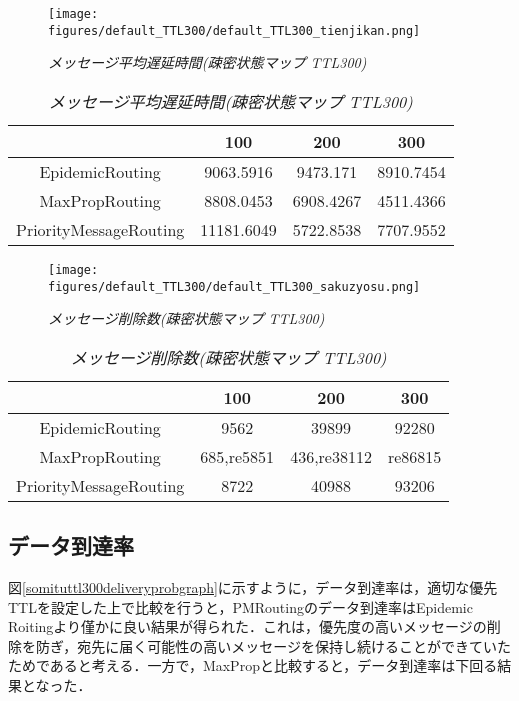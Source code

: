 \documentclass[11pt]{icsthesis}
\begin{document}
\newpage

\begin{figure}[h]
\centering
\texttt{[image: figures/default\_TTL300/default\_TTL300\_tienjikan.png]}
\caption[]{\it{メッセージ平均遅延時間(疎密状態マップ TTL300)}}
\label{somituttl300latencyavggraph}
\end{figure}

\begin{table}[H]
 \begin{center}
      \caption[]{\it{メッセージ平均遅延時間(疎密状態マップ TTL300)}}
      \label{somituTtl300latencyavg}
      \begin{tabular}{|c|c|c|c|}
\hline
&100&200&300\\
\hline
EpidemicRouting&9063.5916&9473.171&8910.7454\\
\hline
MaxPropRouting&8808.0453&6908.4267&4511.4366\\
\hline
PriorityMessageRouting&11181.6049&5722.8538&7707.9552\\
\hline
      \end{tabular}
    \end{center}
\end{table}

\begin{figure}[h]
\centering
\texttt{[image: figures/default\_TTL300/default\_TTL300\_sakuzyosu.png]}
\caption[]{\it{メッセージ削除数(疎密状態マップ TTL300)}}
\label{somituttl300droppedgraph}
\end{figure}

\begin{table}[H]
 \begin{center}
      \caption[]{\it{メッセージ削除数(疎密状態マップ TTL300)}}
      \label{somituTtl300dropped}
      \begin{tabular}{|c|c|c|c|}
\hline
&100&200&300\\
\hline
EpidemicRouting&9562&39899&92280\\
\hline
MaxPropRouting&685,re5851&436,re38112&re86815\\
\hline
PriorityMessageRouting&8722&40988&93206\\
\hline
      \end{tabular}
    \end{center}
\end{table}

\subsection{データ到達率}
図\ref{somituttl300deliveryprobgraph}に示すように，データ到達率は，適切な優先TTLを設定した上で比較を行うと，PMRoutingのデータ到達率はEpidemic Roitingより僅かに良い結果が得られた．これは，優先度の高いメッセージの削除を防ぎ，宛先に届く可能性の高いメッセージを保持し続けることができていたためであると考える．一方で，MaxPropと比較すると，データ到達率は下回る結果となった．\\
\end{document}
